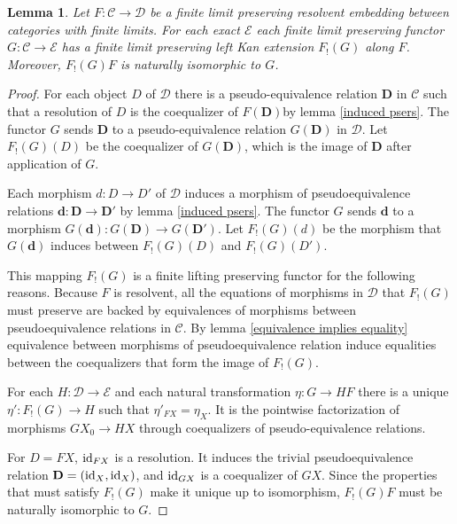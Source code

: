 \documentclass[sort&compress]{elsarticle}
\theoremstyle{plain}
\newtheorem{lemma}[theorem]{Lemma}
\theoremstyle{definition}
\theoremstyle{remark}
\newcommand\cat\mathcal
\newcommand\of:
\begin{document}
\newcommand\di{_!}
\begin{lemma} Let $F\of\cat C\to\cat D$ be a finite limit preserving resolvent embedding between categories with finite limits. For each exact $\cat E$ each finite limit preserving functor $G\of\cat C\to\cat E$ has a finite limit preserving left Kan extension $F\di(G)$ along $F$. Moreover, $F\di(G)F$ is naturally isomorphic to $G$.\label{resolvent to left}\end{lemma}

\newcommand\pser\mathbf
\begin{proof}
For each object $D$ of $\cat D$ there is a pseudo-equivalence relation $\pser D$ in $\cat C$ such that a resolution of $D$ is the coequalizer of $F(\pser D)$by lemma \ref{induced psers}.
The functor $G$ sends $\pser D$ to a pseudo-equivalence relation $G(\pser D)$ in $\cat D$.
Let $F\di(G)(D)$ be the coequalizer of $G(\pser D)$, which is the image of $\pser D$ after application of $G$.

Each morphism $d\of D\to D'$ of $\cat D$ induces a morphism of pseudoequivalence relations $\pser{d}:\pser{D}\to\pser{D'}$ by lemma \ref{induced psers}.
The functor $G$ sends $\pser{d}$ to a morphism $G(\pser{d})\of G(\pser D)\to G(\pser{D'})$.
Let $F\di(G)(d)$ be the morphism that $G(\pser{d})$ induces between $F\di(G)(D)$ and $F\di(G)(D')$.

This mapping $F\di(G)$ is a finite lifting preserving functor for the following reasons. Because $F$ is resolvent, all the equations of morphisms in $\cat D$ that $F\di(G)$ must preserve are backed by equivalences of morphisms between pseudoequivalence relations in $\cat C$. By lemma \ref{equivalence implies equality} equivalence between morphisms of pseudoequivalence relation induce equalities between the coequalizers that form the image of $F\di(G)$.%

For each $H\of\cat D\to\cat E$ and each natural transformation $\eta\of G \to HF$ there is a unique $\eta'\of F\di(G)\to H$ such that $\eta'_{FX}=\eta_X$. It is the pointwise factorization of morphisms $GX_0\to HX$ through coequalizers of pseudo-equivalence relations.

For $D = FX$, $\mathrm{id}_{FX}$ is a resolution. It induces the trivial pseudoequivalence relation $\pser D = (\id_X,\id_X)$, and $\mathrm{id}_{GX}$ is a coequalizer of $GX$. Since the properties that must satisfy $F\di(G)$ make it unique up to isomorphism, $F\di(G)F$ must be naturally isomorphic to $G$. 
\end{proof}
\end{document}
